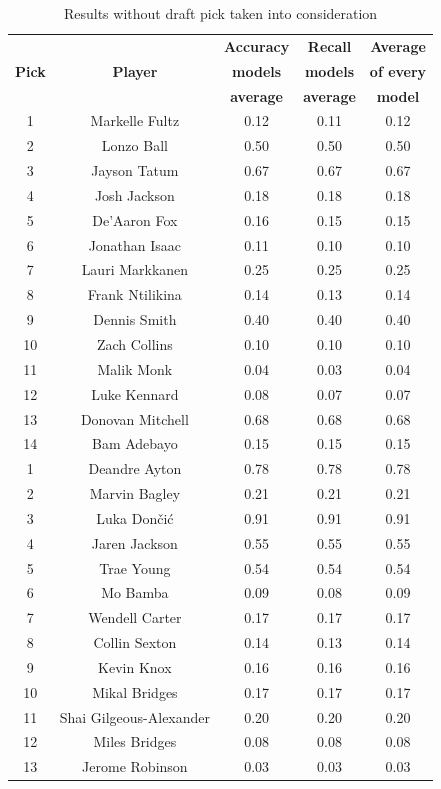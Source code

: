\documentclass[a4paper]{article}
\begin{document}
\begin{table}[!h] %
\begin{center}
\begin{tabular}{|c|c|c|c|c|} \hline
\textbf{ } & \textbf{ } & \textbf{Accuracy} & \textbf{Recall} & \textbf{Average} \\
\textbf{Pick} & \textbf{Player} & \textbf{models} & \textbf{models} & \textbf{of every} \\
\textbf{ } & \textbf{ } & \textbf{average} & \textbf{average} & \textbf{model} \\ \hline
1 & Markelle Fultz & 0.12 & 0.11 & 0.12 \\ \hline
2 & Lonzo Ball & 0.50 & 0.50 & 0.50 \\ \hline
3 & Jayson Tatum & 0.67 & 0.67 & 0.67 \\ \hline
4 & Josh Jackson & 0.18 & 0.18 & 0.18 \\ \hline
5 & De'Aaron Fox & 0.16 & 0.15 & 0.15 \\ \hline
6 & Jonathan Isaac & 0.11 & 0.10 & 0.10 \\ \hline
7 & Lauri Markkanen & 0.25 & 0.25 & 0.25 \\ \hline
8 & Frank Ntilikina & 0.14 & 0.13 & 0.14 \\ \hline
9 & Dennis Smith & 0.40 & 0.40 & 0.40 \\ \hline
10 & Zach Collins & 0.10 & 0.10 & 0.10 \\ \hline
11 & Malik Monk & 0.04 & 0.03 & 0.04 \\ \hline
12 & Luke Kennard & 0.08 & 0.07 & 0.07 \\ \hline
13 & Donovan Mitchell & 0.68 & 0.68 & 0.68 \\ \hline
14 & Bam Adebayo & 0.15 & 0.15 & 0.15 \\ \hline
1 & Deandre Ayton & 0.78 & 0.78 & 0.78 \\ \hline
2 & Marvin Bagley & 0.21 & 0.21 & 0.21 \\ \hline
3 & Luka Dončić & 0.91 & 0.91 & 0.91 \\ \hline
4 & Jaren Jackson & 0.55 & 0.55 & 0.55 \\ \hline
5 & Trae Young & 0.54 & 0.54 & 0.54 \\ \hline
6 & Mo Bamba & 0.09 & 0.08 & 0.09 \\ \hline
7 & Wendell Carter & 0.17 & 0.17 & 0.17 \\ \hline
8 & Collin Sexton & 0.14 & 0.13 & 0.14 \\ \hline
9 & Kevin Knox & 0.16 & 0.16 & 0.16 \\ \hline
10 & Mikal Bridges & 0.17 & 0.17 & 0.17 \\ \hline
11 & Shai Gilgeous-Alexander & 0.20 & 0.20 & 0.20 \\ \hline
12 & Miles Bridges & 0.08 & 0.08 & 0.08 \\ \hline
13 & Jerome Robinson & 0.03 & 0.03 & 0.03 \\ \hline
\end{tabular}
\caption{Results without draft pick taken into consideration}
\label{tab:results_no_draft_pick_all_star}
\end{center}
\end{table}
\end{document}

